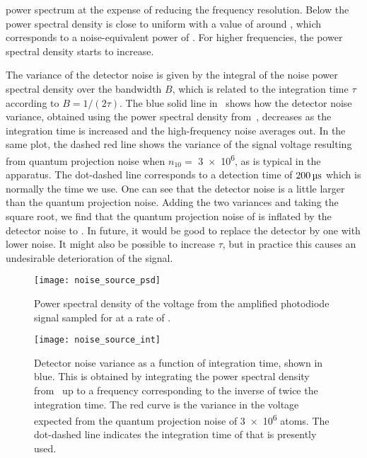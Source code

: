 power spectrum at the expense of reducing the frequency resolution.
Below  the power spectral density is close
to uniform with a value of around
, which corresponds to a
noise-equivalent power of .
For higher frequencies, the power spectral density starts to
increase. 
\par\noindent
The variance of the detector noise is given by the integral of the
noise power spectral density over the bandwidth $B$, which is related
to the integration time $\tau$ according to $B = 1/(2
\tau)$\sivalue{}{\hertz}. The blue solid line
in~ shows how the detector noise
variance, obtained using the power spectral density
from~, decreases as the integration
time is increased and the high-frequency noise averages out. In the same
plot, the dashed red line shows the variance of the signal voltage
resulting from quantum projection noise when $n_{10} =$ \num{3e6}, as
is typical in the apparatus. 
The
dot-dashed line corresponds to a detection time of
$\sivalue{200}{\micro\s}$ which is normally the time we use. One can
see that the detector noise is a little larger than the quantum
projection noise. Adding the two variances and taking the square root,
we find that the quantum projection noise of 
is inflated by the detector noise to . In
future, it would be good to replace the detector by one with lower
noise. It might also be possible to increase $\tau$, but in practice
this causes an undesirable deterioration of the signal.
\begin{figure}[htpb!]
  \centering
  \texttt{[image: noise\_source\_psd]}
  \caption[Power spectral density of the amplified photodiode voltage.]{Power spectral density
    of the voltage from the amplified photodiode signal
  sampled for  at a rate of
.  
}
  \label{fig:noise_source_psd}
\end{figure}
\begin{figure}[htpb!]
  \centering
  \texttt{[image: noise\_source\_int]}
  \caption[Detector noise vs. integration time.]{Detector noise
    variance as a function of integration time, shown in blue. This is
    obtained by integrating the power spectral density
    from~ up to a frequency
    corresponding to the inverse of twice the integration time. The red
    curve is the variance in the voltage expected from the quantum
    projection noise of \num{3e6} atoms. The dot-dashed line indicates
    the integration time of  that is presently
  used.}
  \label{fig:noise_source_int}
\end{figure}


